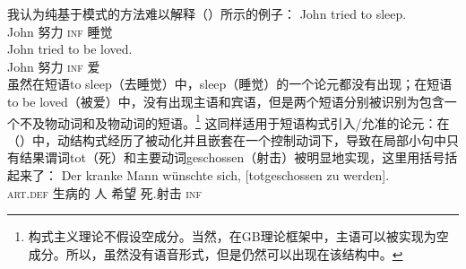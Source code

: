 \begin{exe}
\begin{xlist}[iv.]
\begin{exe}
\begin{xlist}[iv.]
我认为纯基于模式的方法难以解释（）所示的例子：
\eal
\ex 
\gll John tried to sleep.\\
     John 努力 \textsc{inf} 睡觉\\
\ex
\gll John tried to be loved.\\
     John 努力 \textsc{inf} \passive{} 爱\\
\zl
虽然在短语to sleep（去睡觉）中，sleep（睡觉）的一个论元都没有出现；在短语to be loved（被爱）中，没有出现主语和宾语，但是两个短语分别被识别为包含一个不及物动词和及物动词的短语。\footnote{%
构式主义理论不假设空成分。当然，在GB理论框架中，主语可以被实现为空成分。所以，虽然没有语音形式，但是仍然可以出现在该结构中。%
}  
这同样适用于短语构式引入/允准的论元：在（）中，动结构式经历了被动化并且嵌套在一个控制动词下，导致在局部小句中只有结果谓词tot（死）和主要动词geschossen（射击）被明显地实现，这里用括号括起来了：
\ea
\gll Der kranke Mann wünschte sich,   [totgeschossen zu werden].\footnotemark\\
     \textsc{art}.\textsc{def} 生病的   人  希望   \self{} \spacebr{}死.射击      \textsc{inf} \passive\\

\end{xlist}
\end{exe}
\end{xlist}
\end{exe}
